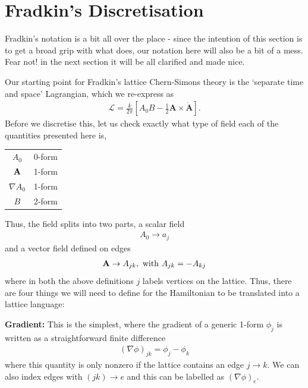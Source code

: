 \documentclass[11pt, oneside]{article} %
\numberwithin{equation}{section}
\begin{document}
\section{Fradkin's Discretisation}
\begin{shaded}
    Fradkin's notation is a bit all over the place - since the intention of this section is to get a broad grip with what \cite{sun_fradkin_2015} does, our notation here will also be a bit of a mess. Fear not! in the next section it will be all clarified and made nice. 
\end{shaded}
Our starting point for Fradkin's lattice Chern-Simons theory is the `separate time and space' Lagrangian, which we re-express as 
\begin{align}
    \mathcal L = \frac{k}{2\pi}
    \left [  
    A_0  B -\frac 12 
    \textbf {A} \times \dot {\textbf {A}} 
    \right ].
\end{align}
Before we discretise this, let us check exactly what type of field each of the quantities presented here is,
\begin{center}
\begin{tabular}{|c|c|}
\hline
    $A_0$ & 0-form \\ 
    $\textbf A$ & 1-form \\ 
    $\nabla A_0$ & 1-form \\ 
    $B$ & 2-form \\ 
    \hline
\end{tabular}
\end{center}
Thus, the field splits into two parts, a scalar field 
\begin{align}
    A_0 \rightarrow a_j
\end{align}
and a vector field defined on edges
\begin{align}
    \textbf A \rightarrow A_{jk}, \textup{ with } A_{jk} = -A_{kj}
\end{align}
where in both the above definitions $j$ labels vertices on the lattice. Thus, there are four things we will need to define for the Hamiltonian to be translated into a lattice language:

\textbf{Gradient: } This is the simplest, where the gradient of a generic 1-form $\phi_j$ is written as a straightforward finite difference
\begin{align}
    (\nabla \phi)_{jk} = \phi_j - \phi_k
\end{align}
where this quantity is only nonzero if the lattice contains an edge $j \rightarrow k$. We can also index edges with $(jk)\rightarrow e$ and this can be labelled as $(\nabla \phi)_e$.
\end{document}

